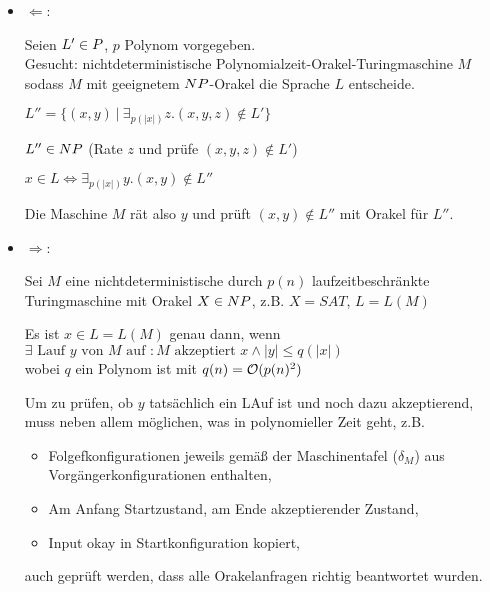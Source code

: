 \begin{beweis}
    
    \begin{itemize}

        \item $\Leftarrow$:

            Seien $L' \in P$, $p$ Polynom vorgegeben.\\

            Gesucht: nichtdeterministische Polynomialzeit-Orakel-Turingmaschine $M$ sodass $M$ mit geeignetem $NP$-Orakel die Sprache $L$ entscheide.

            $L'' = \{ (x,y) \ |\  \exists_{p(|x|)} z . (x,y,z) \notin L' \} $

            $L'' \in NP$ (Rate $z$ und prüfe $(x,y,z) \notin L'$)

            $x \in L \Leftrightarrow \exists_{p(|x|)} y . (x,y) \notin L'' $

            Die Maschine $M$ rät also $y$ und prüft $(x,y) \notin L''$ mit Orakel für $L''$.

        \item $\Rightarrow$:

            Sei $M$ eine nichtdeterministische durch $p(n)$ laufzeitbeschränkte Turingmaschine mit Orakel $X \in NP$, z.B. $X = SAT$, $L = L(M)$

            Es ist $x \in L = L(M)$ genau dann, wenn \\
            $\exists \text{ Lauf } y \text{ von } M \text{ auf }: 
            M \text{ akzeptiert } x \land |y| \leq q(|x|)$ \\
            wobei $q$ ein Polynom ist mit $q(n) = \mathcal{O}(p(n)^2)$

            Um zu prüfen, ob $y$ tatsächlich ein LAuf ist und noch dazu akzeptierend, muss neben allem möglichen, was in polynomieller Zeit geht, z.B. 
            \begin{itemize}
                \item Folgefkonfigurationen jeweils gemäß der Maschinentafel ($\delta_M$) aus Vorgängerkonfigurationen enthalten,
                \item Am Anfang Startzustand, am Ende akzeptierender Zustand,
                \item Input okay in Startkonfiguration kopiert,
            \end{itemize}
            auch geprüft werden, dass alle Orakelanfragen richtig beantwortet wurden.


\end{itemize}
\end{beweis}
